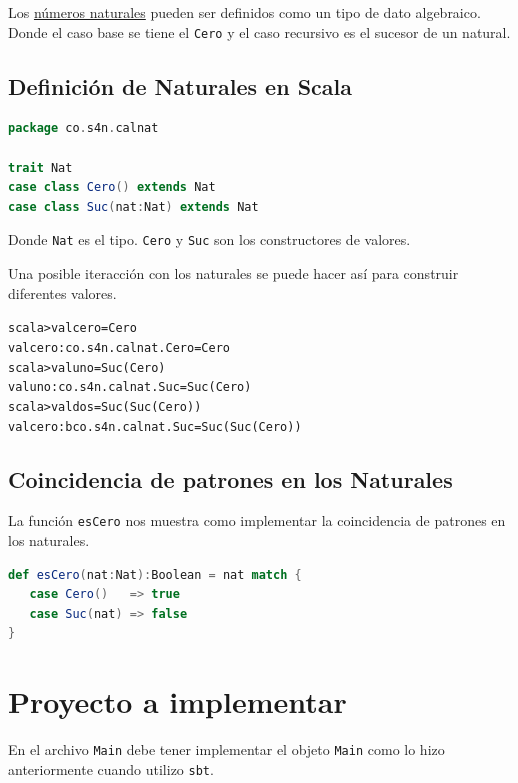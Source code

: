 \documentclass[12pt]{article}
\newcounter{problema}
\begin{document}
Los \href{https://es.wikipedia.org/wiki/N%C3%BAmero_natural}{números naturales} pueden ser definidos como un tipo de dato algebraico. Donde el caso base se tiene el \texttt{Cero} y el caso recursivo es el sucesor de un natural.

\subsection{Definición de Naturales en Scala}
\label{sec:def-naturales}

\begin{lstlisting}[language=Scala]
package co.s4n.calnat

trait Nat
case class Cero() extends Nat
case class Suc(nat:Nat) extends Nat
\end{lstlisting}

Donde \texttt{Nat} es el tipo. \texttt{Cero} y \texttt{Suc} son los constructores de valores.

Una posible iteracción con los naturales se puede hacer así  para construir diferentes valores.

\begin{alltt}
scala> val cero = Cero
val cero: co.s4n.calnat.Cero = Cero
scala> val uno = Suc(Cero)
val uno: co.s4n.calnat.Suc = Suc(Cero)
scala> val dos = Suc(Suc(Cero))
val cero: bco.s4n.calnat.Suc = Suc(Suc(Cero))
\end{alltt}

\subsection{Coincidencia de patrones en los Naturales}
\label{sec:pat-nat}

La función \texttt{esCero} nos muestra como implementar la coincidencia de patrones en los naturales.

\begin{lstlisting}[language=Scala]
def esCero(nat:Nat):Boolean = nat match {
   case Cero()   => true
   case Suc(nat) => false
}
\end{lstlisting}


\section{Proyecto a implementar}
\label{sec:problema-resolver}

En el archivo \texttt{Main} debe tener implementar el objeto \texttt{Main} como lo hizo anteriormente cuando utilizo \texttt{sbt}.
\end{document}
